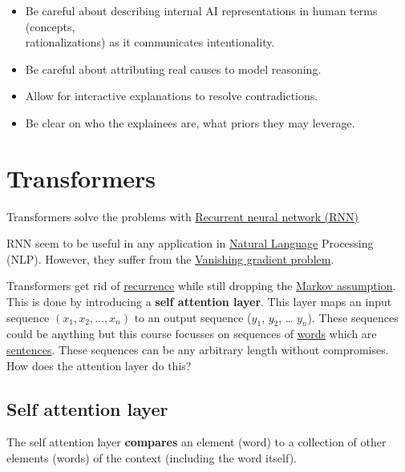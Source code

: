\documentclass[
  11pt,
  british,
]{article}
\providecommand{\tightlist}{%
  \setlength{\itemsep}{0pt}\setlength{\parskip}{0pt}}
\begin{document}
\begin{itemize}
\tightlist
\item
  Be careful about describing internal AI representations in human terms
  (concepts,\\
  rationalizations) as it communicates intentionality.\\
\item
  Be careful about attributing real causes to model reasoning.\\
\item
  Allow for interactive explanations to resolve contradictions.\\
\item
  Be clear on who the explainees are, what priors they may leverage.
\end{itemize}

\hypertarget{transformers}{%
\section{Transformers}\label{transformers}}

Transformers solve the problems with
\href{Recurrent\%20neural\%20network\%20(RNN).md}{Recurrent neural
network (RNN)}

RNN seem to be useful in any application in
\href{../Languages/Natural\%20languages.md}{Natural Language} Processing
(NLP). However, they suffer from the
\href{Vanishing\%20gradient\%20problem.md}{Vanishing gradient problem}.

Transformers get rid of \href{Recurrence.md}{recurrence} while still
dropping the \href{Markov\%20assumption.md}{Markov assumption}. This is
done by introducing a \textbf{self attention layer}. This layer maps an
input sequence \((x_{1}, x_{2}, ..., x_{n})\) to an output sequence
(\(y_1\), \(y_2\), \ldots{} \(y_n\)). These sequences could be anything
but this course focusses on sequences of \href{../Data/Words.md}{words}
which are \href{../Data/Sentences.md}{sentences}. These sequences can be
any arbitrary length without compromises. How does the attention layer
do this?

\hypertarget{self-attention-layer}{%
\subsection{Self attention layer}\label{self-attention-layer}}

The self attention layer \textbf{compares} an element (word) to a
collection of other elements (words) of the context (including the word
itself).
\end{document}
